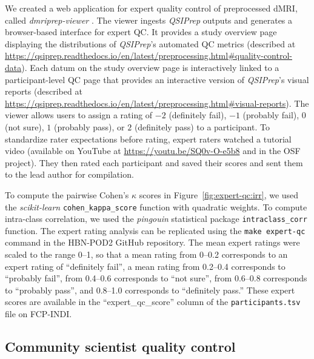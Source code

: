 \documentclass[9pt,lineno]{elife}
\begin{document}
We created a web application for expert quality control of preprocessed dMRI,
called \emph{dmriprep-viewer} \citep{richie-halford2021-viewer}. The viewer
ingests \emph{QSIPrep} outputs and generates a browser-based interface for
expert QC. It provides a study overview page displaying the distributions of
\emph{QSIPrep}'s automated QC metrics (described at
\url{https://qsiprep.readthedocs.io/en/latest/preprocessing.html#quality-control-data}).
Each datum on the study overview page is interactively linked to a participant-level
QC page that provides an interactive version of \emph{QSIPrep}'s visual reports
(described at
\url{https://qsiprep.readthedocs.io/en/latest/preprocessing.html#visual-reports}).
The viewer allows users to assign a rating of $-2$ (definitely fail), $-1$
(probably fail), $0$ (not sure), $1$ (probably pass), or $2$ (definitely pass) to a
participant. To standardize rater expectations before rating, expert raters watched
a tutorial video (available on YouTube at \url{https://youtu.be/SQ0v-O-e5b8} and in the OSF project). They then rated each
participant and saved their scores and sent them to the lead author for compilation.

To compute the pairwise Cohen's $\kappa$ scores in Figure~\ref{fig:expert-qc:irr}, we
used the \emph{scikit-learn} \citep{scikit-learn} \texttt{cohen\_kappa\_score}
function with quadratic weights. To compute intra-class correlation, we used the
\emph{pingouin} statistical package \citep{vallat2018pingouin}
\texttt{intraclass\_corr} function. The expert rating analysis can be replicated
using the \texttt{make expert-qc} command in the HBN-POD2 GitHub repository.
The mean expert ratings were scaled to the range \numrange{0}{1}, so that a mean rating from \numrange{0}{0.2} corresponds to an expert rating of ``definitely fail'', a mean rating from \numrange{0.2}{0.4} corresponds to ``probably fail'', from \numrange{0.4}{0.6} corresponds to ``not sure'', from \numrange{0.6}{0.8} corresponds to ``probably pass'', and \numrange{0.8}{1.0} corresponds to ``definitely pass.'' These expert scores are available in the
``expert\_qc\_score'' column of the \texttt{participants.tsv} file on FCP-INDI.

\subsection{Community scientist quality control}
\end{document}

